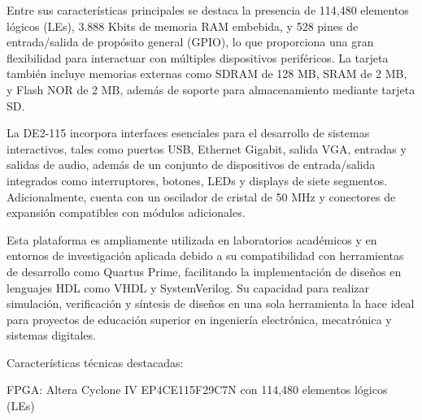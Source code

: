 Entre sus características principales se destaca la presencia de 114,480 elementos lógicos (LEs), 3.888 Kbits de memoria RAM embebida, y 528 pines de entrada/salida de propósito general (GPIO), lo que proporciona una gran flexibilidad para interactuar con múltiples dispositivos periféricos. La tarjeta también incluye memorias externas como SDRAM de 128 MB, SRAM de 2 MB, y Flash NOR de 2 MB, además de soporte para almacenamiento mediante tarjeta SD.

La DE2-115 incorpora interfaces esenciales para el desarrollo de sistemas interactivos, tales como puertos USB, Ethernet Gigabit, salida VGA, entradas y salidas de audio, además de un conjunto de dispositivos de entrada/salida integrados como interruptores, botones, LEDs y displays de siete segmentos. Adicionalmente, cuenta con un oscilador de cristal de 50 MHz y conectores de expansión compatibles con módulos adicionales.

Esta plataforma es ampliamente utilizada en laboratorios académicos y en entornos de investigación aplicada debido a su compatibilidad con herramientas de desarrollo como Quartus Prime, facilitando la implementación de diseños en lenguajes HDL como VHDL y SystemVerilog. Su capacidad para realizar simulación, verificación y síntesis de diseños en una sola herramienta la hace ideal para proyectos de educación superior en ingeniería electrónica, mecatrónica y sistemas digitales. 

Características técnicas destacadas:

FPGA: Altera Cyclone IV EP4CE115F29C7N con 114,480 elementos lógicos (LEs)

